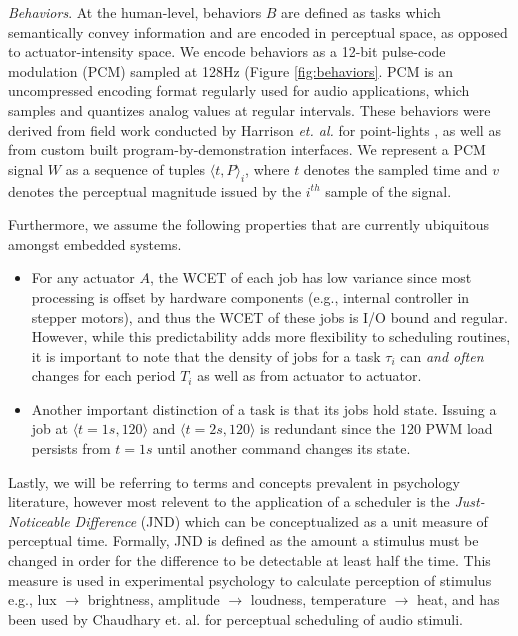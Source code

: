 \documentclass{sigchi}
\begin{document}
  \textit{Behaviors}. At the human-level, behaviors $B$ are defined as tasks which semantically convey information and are encoded in perceptual space, as opposed to actuator-intensity space. We encode behaviors as a 12-bit pulse-code modulation (PCM) sampled at 128Hz (Figure \ref{fig:behaviors}. PCM is an uncompressed encoding format regularly used for audio applications, which samples and quantizes analog values at regular intervals. These behaviors were derived from field work conducted by Harrison \textit{et. al.} for point-lights \cite{harrison_unlocking_2012}, as well as from custom built program-by-demonstration interfaces. We represent a PCM signal $W$ as a sequence of tuples $\langle t, P \rangle_i$, where $t$ denotes the sampled time and $v$ denotes the perceptual magnitude issued by the $i^{th}$ sample of the signal.


  Furthermore, we assume the following properties that are currently ubiquitous amongst embedded systems. 

  \begin{itemize}
  \item For any actuator $A$, the WCET of each job has low variance since most processing is offset by hardware components (e.g., internal controller in stepper motors), and thus the WCET of these jobs is I/O bound and regular. However, while this predictability adds more flexibility to scheduling routines, it is important to note that the density of jobs for a task $\tau_i$ can \textit{and often} changes for each period $T_i$ as well as from actuator to actuator.

  \item Another important distinction of a task is that its jobs hold state. Issuing a job at $\langle t=1s, 120 \rangle$ and $\langle t=2s, 120 \rangle$ is redundant since the 120 PWM load persists from $t=1s$ until another command changes its state.
  \end{itemize}

  Lastly, we will be referring to terms and concepts prevalent in psychology literature, however most relevent to the application of a scheduler is the \textit{Just-Noticeable Difference} (JND) which can be conceptualized as a unit measure of perceptual time. Formally, JND is defined as the amount a stimulus must be changed in order for the difference to be detectable at least half the time. 
  This measure is used in experimental psychology to calculate perception of stimulus e.g., lux $\rightarrow$ brightness, amplitude $\rightarrow$ loudness, temperature $\rightarrow$ heat, and has been used by Chaudhary et. al.\cite{chaudhary_perceptual_2001} for perceptual scheduling of audio stimuli. 
\end{document}

